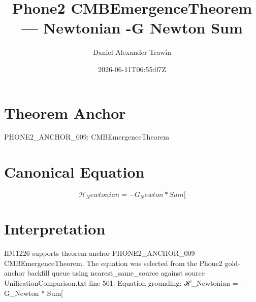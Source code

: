 \documentclass[11pt]{article}
\title{Phone2 CMBEmergenceTheorem — Newtonian -G Newton Sum}
\author{Daniel Alexander Trawin}
\date{2026-06-11T06:55:07Z}
\begin{document}
\maketitle
\section*{Theorem Anchor}
PHONE2_ANCHOR_009: CMBEmergenceTheorem
\section*{Canonical Equation}
\[
ℋ_Newtonian = -G_Newton * Sum[
\]
\section*{Interpretation}
ID11226 supports theorem anchor PHONE2_ANCHOR_009 CMBEmergenceTheorem. The equation was selected from the Phone2 gold-anchor backfill queue using nearest_same_source against source UnificationComparison.txt line 501. Equation grounding: ℋ_Newtonian = -G_Newton * Sum[
\end{document}
